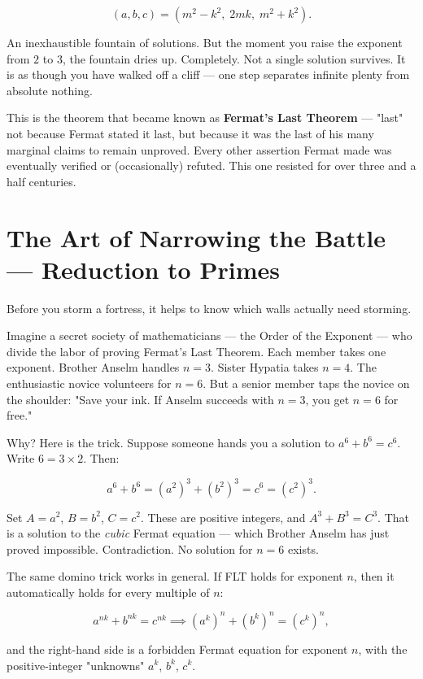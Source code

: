 \[
(a, b, c) = (m^2 - k^2,\; 2mk,\; m^2 + k^2).
\]

An inexhaustible fountain of solutions. But the moment you raise the exponent from $2$ to $3$, the fountain dries up. Completely. Not a single solution survives. It is as though you have walked off a cliff --- one step separates infinite plenty from absolute nothing.

This is the theorem that became known as \textbf{Fermat's Last Theorem} --- "last" not because Fermat stated it last, but because it was the last of his many marginal claims to remain unproved. Every other assertion Fermat made was eventually verified or (occasionally) refuted. This one resisted for over three and a half centuries.


\ornbreak



\section{The Art of Narrowing the Battle --- Reduction to Primes}


Before you storm a fortress, it helps to know which walls actually need storming.

Imagine a secret society of mathematicians --- the Order of the Exponent --- who divide the labor of proving Fermat's Last Theorem. Each member takes one exponent. Brother Anselm handles $n = 3$. Sister Hypatia takes $n = 4$. The enthusiastic novice volunteers for $n = 6$. But a senior member taps the novice on the shoulder: "Save your ink. If Anselm succeeds with $n = 3$, you get $n = 6$ for free."

Why? Here is the trick. Suppose someone hands you a solution to $a^6 + b^6 = c^6$. Write $6 = 3 \times 2$. Then:

\[
a^6 + b^6 = (a^2)^3 + (b^2)^3 = c^6 = (c^2)^3.
\]

Set $A = a^2$, $B = b^2$, $C = c^2$. These are positive integers, and $A^3 + B^3 = C^3$. That is a solution to the \textit{cubic} Fermat equation --- which Brother Anselm has just proved impossible. Contradiction. No solution for $n = 6$ exists.

The same domino trick works in general. If FLT holds for exponent $n$, then it automatically holds for every multiple of $n$:

\[
a^{nk} + b^{nk} = c^{nk} \implies (a^k)^n + (b^k)^n = (c^k)^n,
\]

and the right-hand side is a forbidden Fermat equation for exponent $n$, with the positive-integer "unknowns" $a^k$, $b^k$, $c^k$.

